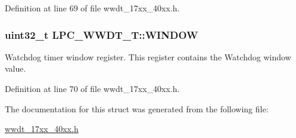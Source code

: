 Definition at line 69 of file wwdt\+\_\+17xx\+\_\+40xx.\+h.

\subsubsection[{\texorpdfstring{W\+I\+N\+D\+OW}{WINDOW}}]{ uint32\+\_\+t L\+P\+C\+\_\+\+W\+W\+D\+T\+\_\+\+T\+::\+W\+I\+N\+D\+OW}\hypertarget{structLPC__WWDT__T_abcc1eca1d9cc366b693a5333fb75d1e0}{}\label{structLPC__WWDT__T_abcc1eca1d9cc366b693a5333fb75d1e0}
Watchdog timer window register. This register contains the Watchdog window value. 

Definition at line 70 of file wwdt\+\_\+17xx\+\_\+40xx.\+h.



The documentation for this struct was generated from the following file\+:\begin{DoxyCompactItemize}
\item 
\hyperlink{wwdt__17xx__40xx_8h}{wwdt\+\_\+17xx\+\_\+40xx.\+h}\end{DoxyCompactItemize}
